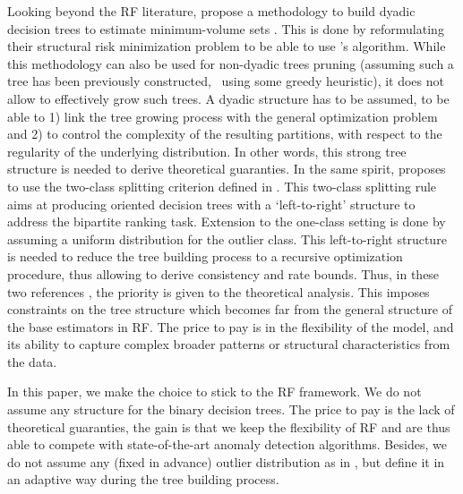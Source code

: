 Looking beyond the RF literature, \cite{Scott2006} propose a methodology to build dyadic decision trees to estimate minimum-volume sets \citep{Polonik97, Einmahl1992}. This is done by reformulating their structural risk minimization problem to be able to use \cite{Blanchard2004}'s algorithm. 
While this methodology can also be used for non-dyadic trees pruning (assuming such a tree has been previously constructed, \eg~using some greedy heuristic), it does not allow to effectively grow such trees. A dyadic structure has to be assumed, to be able to 1) link the tree growing process with the general optimization problem and 2) to control the complexity of the resulting partitions, with respect to the regularity of the underlying distribution. In other words, this strong tree structure is needed to derive theoretical guaranties.
In the same spirit, \cite{CLEM14} proposes to use the two-class splitting criterion defined in \cite{Clemencon2009Tree}. This two-class splitting rule aims at producing oriented decision trees with a `left-to-right' structure to address the bipartite ranking task. 
Extension to the one-class setting is done by assuming a uniform distribution for the outlier class. This left-to-right structure is needed to reduce the tree building process to a recursive optimization procedure, thus allowing to derive consistency and rate bounds. 
%
Thus, in these two references \citep{Scott2006, CLEM14}, the priority is given to the theoretical analysis. This imposes constraints on the tree structure which becomes far from the general structure of the base estimators in RF. The price to pay is in the flexibility of the model, and its ability to capture complex broader patterns or structural characteristics from the data.

In this paper, we make the choice to stick to the RF framework. We do not assume any structure for the binary decision trees. The price to pay is the lack of theoretical guaranties, the gain is that we keep the flexibility of RF and are thus able to compete with state-of-the-art anomaly detection algorithms.
Besides, we do not assume any (fixed in advance) outlier distribution as in \cite{CLEM14}, but define it in an adaptive way during the tree building process.


